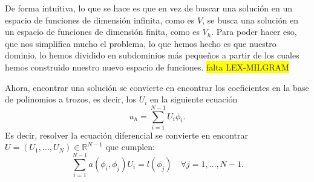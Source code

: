 \documentclass[a4paper,11pt,spanish, twoside, leqno]{tfg-uam}
\theoremstyle{definition}
\begin{document}
De forma intuitiva, lo que se hace es que en vez de buscar una solución en un espacio de funciones de dimensión infinita, como es $V$, se busca una solución en un espacio de funciones de dimensión finita, como es $V_h$. Para poder hacer eso, que nos simplifica mucho el problema, lo que hemos hecho es que nuestro dominio, lo hemos dividido en subdominios más pequeños a partir de los cuales hemos construido nuestro nuevo espacio de funciones. \colorbox{yellow}{falta LEX-MILGRAM}

Ahora, encontrar una solución se convierte en encontrar los coeficientes en la base de polinomios a trozos, es decir, los $U_i$ en la siguiente ecuación
\begin{equation}
    u_h = \sum_{i=1}^{N-1} U_i\phi_i.
\end{equation}
Es decir, resolver la ecuación diferencial se convierte en encontrar $U=(U_1,\dots, U_N) \in \mathbb{R}^{N-1}$ que cumplen:
\begin{equation}
    \sum_{i=1}^{N-1} a\left( \phi_i,\phi_j\right)U_i = l(\phi_j) \quad \forall j = 1,\dots,N-1.
\end{equation}
\end{document}
